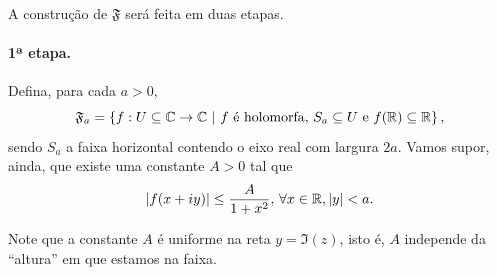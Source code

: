         A construção de $\mathfrak{F}$ será feita em duas etapas.
        
        \paragraph{1ª etapa.} Defina, para cada $a>0$,
        \begin{equation*}
            \mathfrak{F}_a = \left\{ f:U\subseteq\C\to\C \ | \ 
            f \text{ é holomorfa, } S_a\subseteq U \text{ e } f(\R)\subseteq\R \right\},
        \end{equation*}
        sendo $S_a$ a faixa horizontal contendo o eixo real com largura $2a$. Vamos supor, ainda,
        que existe uma constante $A>0$ tal que
        \begin{equation*}
            |f(x+iy)| \leq \frac{A}{1 + x^2}, \, \forall x\in\mathbb{R}, |y|<a.
        \end{equation*}
        \begin{figure}[H]
				\centering 
			\end{figure}
        Note que a constante $A$ é uniforme na reta $y = \Im(z)$, isto é, $A$ independe da 
        ``altura'' em que estamos na faixa.
        
